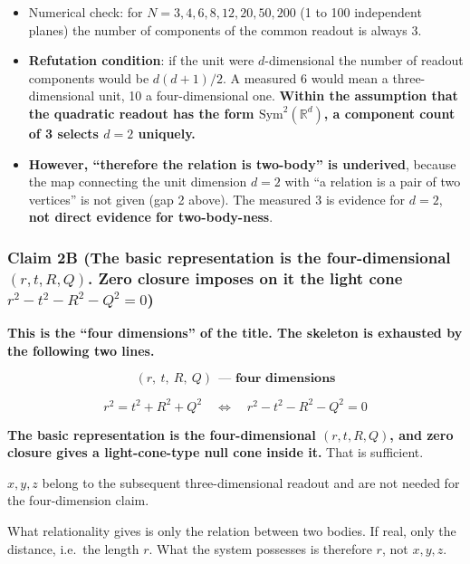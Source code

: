 \documentclass[
  10pt,
]{article}
\providecommand{\tightlist}{%
  \setlength{\itemsep}{0pt}\setlength{\parskip}{0pt}}
\begin{document}
\begin{itemize}
\tightlist
\item
  Numerical check: for \(N = 3,4,6,8,12,20,50,200\) (1 to 100
  independent planes) the number of components of the common readout is
  always 3.
\item
  \textbf{Refutation condition}: if the unit were \(d\)-dimensional the
  number of readout components would be \(d(d+1)/2\). A measured 6 would
  mean a three-dimensional unit, 10 a four-dimensional one.
  \textbf{Within the assumption that the quadratic readout has the form
  \(\mathrm{Sym}^2(\mathbb{R}^d)\), a component count of 3 selects
  \(d=2\) uniquely.}
\item
  \textbf{However, ``therefore the relation is two-body'' is underived},
  because the map connecting the unit dimension \(d=2\) with ``a
  relation is a pair of two vertices'' is not given (gap 2 above). The
  measured 3 is evidence for \(d=2\), \textbf{not direct evidence for
  two-body-ness}.
\end{itemize}

\subsubsection{\texorpdfstring{Claim 2B (The basic representation is the
four-dimensional \((r,t,R,Q)\). Zero closure imposes on it the light
cone
\(r^2-t^2-R^2-Q^2=0\))}{Claim 2B (The basic representation is the four-dimensional (r,t,R,Q). Zero closure imposes on it the light cone r\^{}2-t\^{}2-R\^{}2-Q\^{}2=0)}}\label{claim-2b-the-basic-representation-is-the-four-dimensional-rtrq.-zero-closure-imposes-on-it-the-light-cone-r2-t2-r2-q20}

\textbf{This is the ``four dimensions'' of the title. The skeleton is
exhausted by the following two lines.}

\[\boxed{\;(r,\ t,\ R,\ Q)\ \ \textbf{— four dimensions}\;}\]

\[\boxed{\;r^2 = t^2 + R^2 + Q^2 \quad\Longleftrightarrow\quad r^2 - t^2 - R^2 - Q^2 = 0\;}\]

\textbf{The basic representation is the four-dimensional \((r,t,R,Q)\),
and zero closure gives a light-cone-type null cone inside it.} That is
sufficient.

\(x, y, z\) belong to the subsequent three-dimensional readout and are
not needed for the four-dimension claim.

What relationality gives is only the relation between two bodies. If
real, only the distance, i.e.~the length \(r\). What the system
possesses is therefore \(r\), not \(x, y, z\).
\end{document}
